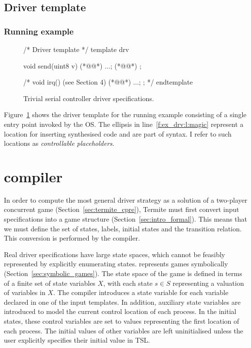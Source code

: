 \subsection{Driver template}

\subsubsection{Running example}

\begin{figure}
\lstset{firstnumber=last}
\begin{tsllisting}[name=ex]
/* Driver template */
template drv 

    void send(uint8 v){ (*@\label{f:ex_drv:l:send}@*)
        ...; (*@\label{f:ex_drv:l:magic}@*)
    }; 

    /*
    void irq(){ (see Section 4) (*@\label{f:ex_drv:l:irq}@*)
        ...;
    }; 
    */
endtemplate
\end{tsllisting}
\caption{Trivial serial controller driver specifications.}
\label{f:ex_drv}
\end{figure}

Figure~\ref{f:ex_drv} shows the driver template for the running example consisting of a single  entry point invoked by the OS\@.  The ellipsis in line~\ref{f:ex_drv:l:magic} represent a location for inserting synthesised code and are part of \tsl syntax.  I refer to such locations as \emph{controllable placeholders}. 

\section{\tsl compiler}
\label{sec:tsl_compiler}

In order to compute the most general driver strategy as a solution of a two-player concurrent game (Section~\ref{sec:termite_cpre}), Termite must first convert input \tsl specifications into a game structure (Section~\ref{sec:intro_formal}). This means that we must define the set of states, labels, initial states and the transition relation. This conversion is performed by the \tsl compiler.

Real driver specifications have large state spaces, which cannot be feasibly represented by explicitly enumerating states. \termite represents games symbolically (Section~\ref{sec:symbolic_games}).  The state space of the game is defined in terms of a finite set of state variables $X$, with each state $s\in S$ representing a valuation of variables in $X$.  The \tsl compiler introduces a state variable for each \tsl variable declared in one of the input templates.  In addition, auxiliary state variables are introduced to model the current control location of each \tsl process. In the initial states, these control variables are set to values representing the first location of each process. The initial values of other variables are left uninitialised unless the user explicitly specifies their initial value in TSL.
        
